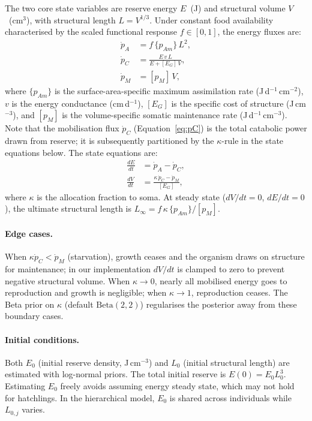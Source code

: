 \documentclass[article,shortnames]{jss}
\newcommand{\pAm}{\{p_{Am}\}}
\newcommand{\pM}{[p_M]}
\newcommand{\EG}{[E_G]}
\begin{document}
The two core state variables are reserve energy $E$~(J) and structural
volume $V$~(cm$^3$), with structural length $L = V^{1/3}$.  Under
constant food availability characterised by the scaled functional
response $f \in [0, 1]$, the energy fluxes are:
\begin{align}
  \dot{p}_A &= f \, \pAm \, L^2,  \label{eq:pA} \\
  \dot{p}_C &= \frac{E \, v \, L}{E + \EG \, V},  \label{eq:pC} \\
  \dot{p}_M &= \pM \, V,  \label{eq:pM}
\end{align}
where $\pAm$ is the surface-area-specific maximum assimilation rate
(J\,d$^{-1}$\,cm$^{-2}$), $v$ is the energy conductance
(cm\,d$^{-1}$), $\EG$ is the specific cost of structure
(J\,cm$^{-3}$), and $\pM$ is the volume-specific somatic maintenance
rate (J\,d$^{-1}$\,cm$^{-3}$).  Note that the mobilisation flux
$\dot{p}_C$ (Equation~\ref{eq:pC}) is the total catabolic power
drawn from reserve; it is subsequently partitioned by the
$\kappa$-rule in the state equations below.  The state equations
are:
\begin{align}
  \frac{dE}{dt} &= \dot{p}_A - \dot{p}_C,  \label{eq:dE} \\
  \frac{dV}{dt} &= \frac{\kappa \, \dot{p}_C - \dot{p}_M}{\EG},
    \label{eq:dV}
\end{align}
where $\kappa$ is the allocation fraction to soma.  At steady state
($dV/dt = 0$, $dE/dt = 0$), the ultimate structural length is
$L_\infty = f \, \kappa \, \pAm / \pM$.

\paragraph{Edge cases.}
When $\kappa \dot{p}_C < \dot{p}_M$ (starvation), growth ceases and
the organism draws on structure for maintenance; in our implementation
$dV/dt$ is clamped to zero to prevent negative structural volume.
When $\kappa \to 0$, nearly all mobilised energy goes to reproduction
and growth is negligible; when $\kappa \to 1$, reproduction ceases.
The Beta prior on $\kappa$ (default $\mathrm{Beta}(2,2)$) regularises
the posterior away from these boundary cases.

\paragraph{Initial conditions.}
Both $E_0$ (initial reserve density, J\,cm$^{-3}$) and $L_0$
(initial structural length) are estimated with log-normal priors.
The total initial reserve is $E(0) = E_0 L_0^3$.  Estimating $E_0$
freely avoids assuming energy steady state, which may not hold for
hatchlings.  In the hierarchical model, $E_0$ is shared across
individuals while $L_{0,j}$ varies.
\end{document}
